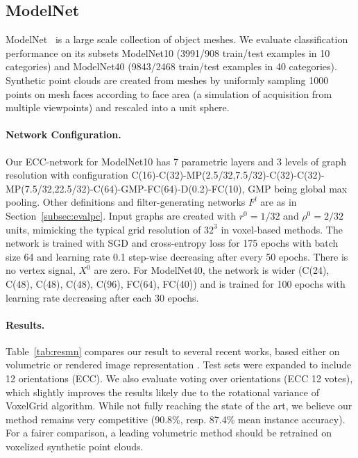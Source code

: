 \documentclass[10pt,twocolumn,letterpaper]{article}
\begin{document}
\subsection{ModelNet} \label{subsec:evalmn}

ModelNet~\cite{modelnet} is a large scale collection of object meshes. We evaluate classification performance on its subsets ModelNet10 (3991/908 train/test examples in 10 categories) and ModelNet40 (9843/2468 train/test examples in 40 categories). Synthetic point clouds are created from meshes by uniformly sampling 1000 points on mesh faces according to face area (a simulation of acquisition from multiple viewpoints) and rescaled into a unit sphere.

\paragraph*{Network Configuration.}
Our ECC-network for ModelNet10 has 7 parametric layers and 3 levels of graph resolution with configuration C(16)-C(32)-MP(2.5/32,7.5/32)-C(32)-C(32)-MP(7.5/32,22.5/32)-C(64)-GMP-FC(64)-D(0.2)-FC(10), GMP being global max pooling. Other definitions and filter-generating networks $F^l$ are as in Section~\ref{subsec:evalpc}. Input graphs are created with $r^0=1/32$ and $\rho^0=2/32$ units, mimicking the typical grid resolution of $32^3$ in voxel-based methods. The network is trained with SGD and cross-entropy loss for 175 epochs with batch size 64 and learning rate 0.1 step-wise decreasing after every 50 epochs. There is no vertex signal, \ie $X^0$ are zero. For ModelNet40, the network is wider (C(24), C(48), C(48), C(48), C(96), FC(64), FC(40)) and is trained for 100 epochs with learning rate decreasing after each 30 epochs.

\paragraph*{Results.} 
Table~\ref{tab:resmn} compares our result to several recent works, based either on volumetric \cite{modelnet, voxnet, orion, qi16} or rendered image representation \cite{Su15}. Test sets were expanded to include 12 orientations (ECC). We also evaluate voting over orientations (ECC 12 votes), which slightly improves the results likely due to the rotational variance of VoxelGrid algorithm. While not fully reaching the state of the art, we believe our method remains very competitive (90.8\%, resp. 87.4\% mean instance accuracy). For a fairer comparison, a leading volumetric method should be retrained on voxelized synthetic point clouds.
\end{document}
